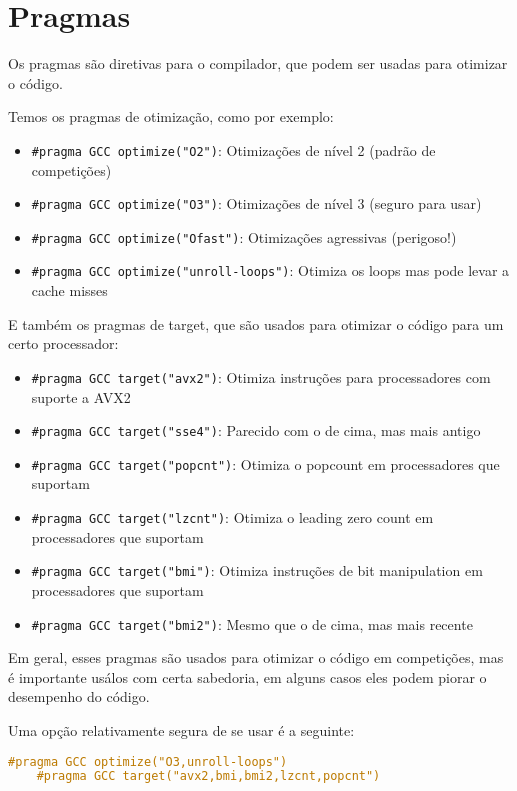\section{Pragmas}

Os pragmas são diretivas para o compilador, que podem ser usadas para otimizar o código.

Temos os pragmas de otimização, como por exemplo:

\begin{itemize}
    \item \texttt{\#pragma GCC optimize("O2")}: Otimizações de nível 2 (padrão de competições)
    \item \texttt{\#pragma GCC optimize("O3")}: Otimizações de nível 3 (seguro para usar)
    \item \texttt{\#pragma GCC optimize("Ofast")}: Otimizações agressivas (perigoso!)
    \item \texttt{\#pragma GCC optimize("unroll-loops")}: Otimiza os loops mas pode levar a cache misses
\end{itemize}

E também os pragmas de target, que são usados para otimizar o código para um certo processador:

\begin{itemize}
    \item \texttt{\#pragma GCC target("avx2")}: Otimiza instruções para processadores com suporte a AVX2
    \item \texttt{\#pragma GCC target("sse4")}: Parecido com o de cima, mas mais antigo
    \item \texttt{\#pragma GCC target("popcnt")}: Otimiza o popcount em processadores que suportam
    \item \texttt{\#pragma GCC target("lzcnt")}: Otimiza o leading zero count em processadores que suportam
    \item \texttt{\#pragma GCC target("bmi")}: Otimiza instruções de bit manipulation em processadores que suportam
    \item \texttt{\#pragma GCC target("bmi2")}: Mesmo que o de cima, mas mais recente
\end{itemize}

Em geral, esses pragmas são usados para otimizar o código em competições, mas é importante usálos com certa sabedoria, em alguns casos eles podem piorar o desempenho do código.

Uma opção relativamente segura de se usar é a seguinte:

\begin{lstlisting}[language=C++]
    #pragma GCC optimize("O3,unroll-loops")
    #pragma GCC target("avx2,bmi,bmi2,lzcnt,popcnt")
\end{lstlisting}

